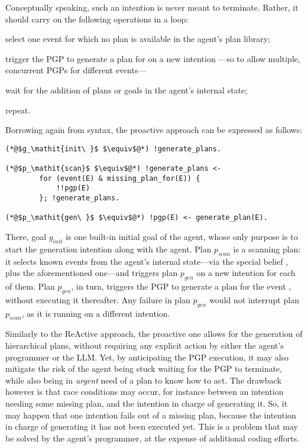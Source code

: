\documentclass[12pt,a4paper,openright,twoside]{book}
\begin{document}
Conceptually speaking, such an intention is never meant to terminate.
%
Rather, it should carry on the following operations in a loop:
%
\begin{inlinelist}
    \item select one event  for which no plan is available in the agent's plan library;
    \item trigger the \ac{PGP} to generate a plan for  on a new intention
   ---so to allow multiple, concurrent \acp{PGP} for different events---
    \item wait for the addition of plans or goals in the agent's internal state;
    \item repeat.
\end{inlinelist}
%
Borrowing again from \jason{} syntax, the proactive approach can be expressed as follows:
%
\begin{lstlisting}
(*@$g_\mathit{init\ }$ $\equiv$@*) !generate_plans.

(*@$p_\mathit{scan}$ $\equiv$@*) !generate_plans <-
        for (event(E) & missing_plan_for(E)) {
            !!pgp(E)
        }; !generate_plans.

(*@$p_\mathit{gen\ }$ $\equiv$@*) !pgp(E) <- generate_plan(E).
\end{lstlisting}
%
There, goal $g_\mathit{init}$ is one built-in initial goal of the agent, whose only purpose is to start the generation intention along with the agent.
%
Plan $p_\mathit{scan}$ is a scanning plan: it selects known events from the agent's internal state---via the special belief , plus the aforementioned  one---and triggers plan $p_\mathit{gen}$ on a new intention for each of them.
%
Plan $p_\mathit{gen}$, in turn, triggers the \ac{PGP} to generate a plan for the event , without executing it thereafter.
%
Any failure in plan $p_\mathit{gen}$ would not interrupt plan $p_\mathit{scan}$, as it is running on a different intention.

Similarly to the \ac{ReAct}ive approach, the proactive one allows for the generation of hierarchical plans, without requiring any explicit action by either the agent's programmer or the \ac{LLM}.
%
Yet, by anticipating the \ac{PGP} execution, it may also mitigate the risk of the agent being stuck waiting for the \ac{PGP} to terminate, while also being in \emph{urgent} need of a plan to know how to act.
%
The drawback however is that race conditions may occur, for instance between an intention needing some missing plan, and the intention in charge of generating it.
%
So, it may happen that one intention fails out of a missing plan, because the intention in charge of generating it has not been executed yet.
%
This is a problem that may be solved by the agent's programmer, at the expense of additional coding efforts.
\end{document}
